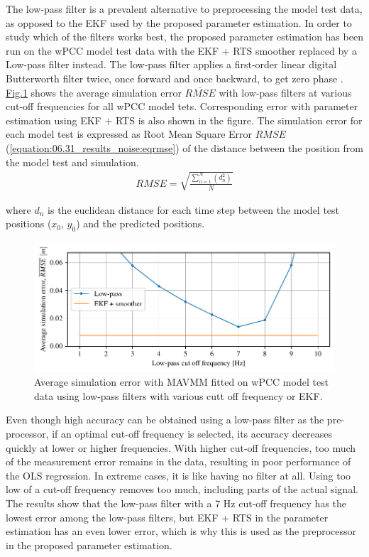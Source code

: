 The low-pass filter is a prevalent alternative to preprocessing the model test data, as opposed to the EKF used by the proposed parameter estimation.
In order to study which of the filters works best, the proposed parameter estimation has been run on the wPCC model test data with the EKF + RTS smoother replaced by a Low-pass filter instead. The low-pass filter applies a first-order linear digital Butterworth filter twice, once forward and once backward, to get zero phase \cite{virtanen_scipy_2020}. \hyperref[\detokenize{06.31_results_noise:fig-lowpass-accuracy}]{Fig.\@ \ref{\detokenize{06.31_results_noise:fig-lowpass-accuracy}}} shows the average simulation error \( \overline{RMSE} \) with low-pass filters at various cut-off frequencies for all wPCC model tets. Corresponding error with parameter estimation using EKF + RTS is also shown in the figure. The simulation error for each model test is expressed as Root Mean Square Error \(RMSE\) (\autoref{equation:06.31_results_noise:eqrmse}) of the distance between the position from the model test and simulation.
\begin{equation}\label{equation:06.31_results_noise:eqrmse}
\begin{split}RMSE=\sqrt{ \frac{\sum_{n=1}^{N} (d_n^2) }{N}} \end{split}
\end{equation}

where \(d_n\) is the euclidean distance for each time step between the model test positions (\(x_0\), \(y_0\)) and the predicted positions.

\begin{figure}[!htb]
\centering
\includegraphics{kappa/images/6.pdf}
\caption{Average simulation error with MAVMM fitted on wPCC model test data using low-pass filters with various cutt off frequency or EKF.}\label{\detokenize{06.31_results_noise:fig-lowpass-accuracy}}\end{figure}


Even though high accuracy can be obtained using a low-pass filter as the pre-processor, if an optimal cut-off frequency is selected, its accuracy decreases quickly at lower or higher frequencies. With higher cut-off frequencies, too much of the measurement error remains in the data, resulting in poor performance of the OLS regression. In extreme cases, it is like having no filter at all. Using too low of a cut-off frequency removes too much, including parts of the actual signal. The results show that the low-pass filter with a 7 Hz cut-off frequency has the lowest error among the low-pass filters, but EKF + RTS in the parameter estimation has an even lower error, which is why this is used as the preprocessor in the proposed parameter estimation.
